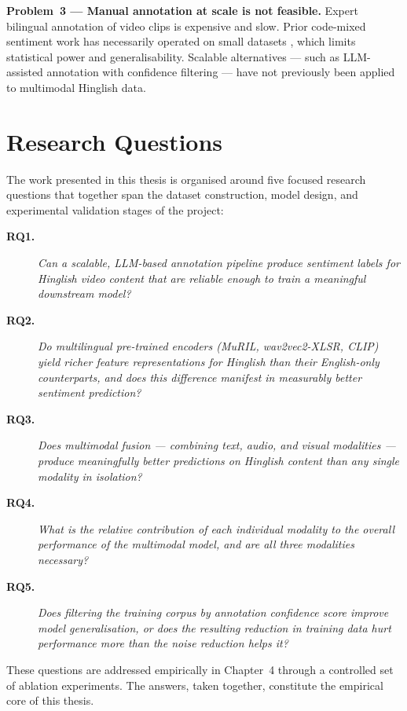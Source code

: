 \textbf{Problem~3 --- Manual annotation at scale is not feasible.} Expert bilingual annotation of video clips is expensive and slow. Prior code-mixed sentiment work has necessarily operated on small datasets \cite{joshi2016towards, barman2014code}, which limits statistical power and generalisability. Scalable alternatives --- such as LLM-assisted annotation with confidence filtering --- have not previously been applied to multimodal Hinglish data.

\section{Research Questions}

The work presented in this thesis is organised around five focused research questions that together span the dataset construction, model design, and experimental validation stages of the project:

\begin{description}
    \item[\textbf{RQ1.}] \textit{Can a scalable, LLM-based annotation pipeline produce sentiment labels for Hinglish video content that are reliable enough to train a meaningful downstream model?}

    \item[\textbf{RQ2.}] \textit{Do multilingual pre-trained encoders (MuRIL, wav2vec2-XLSR, CLIP) yield richer feature representations for Hinglish than their English-only counterparts, and does this difference manifest in measurably better sentiment prediction?}

    \item[\textbf{RQ3.}] \textit{Does multimodal fusion --- combining text, audio, and visual modalities --- produce meaningfully better predictions on Hinglish content than any single modality in isolation?}

    \item[\textbf{RQ4.}] \textit{What is the relative contribution of each individual modality to the overall performance of the multimodal model, and are all three modalities necessary?}

    \item[\textbf{RQ5.}] \textit{Does filtering the training corpus by annotation confidence score improve model generalisation, or does the resulting reduction in training data hurt performance more than the noise reduction helps it?}
\end{description}

These questions are addressed empirically in Chapter~4 through a controlled set of ablation experiments. The answers, taken together, constitute the empirical core of this thesis.

